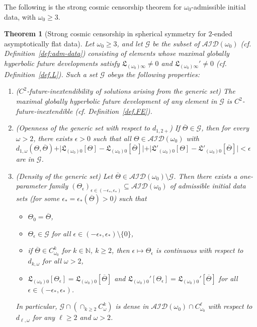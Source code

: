 \documentclass[10pt, reqno]{amsart}
\newtheorem{theorem}{Theorem}[section]
\theoremstyle{definition}
\theoremstyle{remark}
\numberwithin{equation}{section}
\newcommand{\abs}[1]{\vert#1\vert}
\newcommand{\ep}{\epsilon}
\newcommand{\0}{\emptyset}
\newcommand{\eps}{\epsilon}
\newcommand{\Tht}{\Theta}
\newcommand{\omg}{\omega}
\newcommand{\om}{\omega}
\newcommand{\calA}{\mathcal A}
\newcommand{\calD}{\mathcal D}
\newcommand{\calG}{\mathcal G}
\newcommand{\calI}{\mathcal I}
\begin{document}
The following is the strong cosmic censorship theorem for $\omg_{0}$-admissible initial data, with $\omg_0 \geq 3$.
\begin{theorem}[Strong cosmic censorship in spherical symmetry for $2$-ended asymptotically flat data] \label{cor:scc}
Let $\omg_{0} \geq 3$, and let $\calG$ be the subset of $\calA \calI \calD(\omg_{0})$ (cf. Definition~\ref{def:adm-data}) consisting of elements whose maximal globally hyperbolic future developments satisfy $\mathfrak{L}_{(\omg_{0}) \infty} \neq 0$ and $\mathfrak{L}_{(\omg_{0}) \infty}' \neq 0$ (cf. Definition~\ref{def.L}). Such a set $\calG$ obeys the following properties:
\begin{enumerate}
\item ($C^2$-future-inextendibility of solutions arising from the generic set) The maximal globally hyperbolic future development of any element in $\mathcal G$ is $C^2$-future-inextendible (cf. Definition~\ref{def.FE}).
\item (Openness of the generic set with respect to $d_{1, 2+}$) If $\overline{\Tht} \in \mathcal G$, then for every $\om>2$, there exists $\ep>0$ such that all $\Tht \in \calA \calI \calD(\omg_{0})$ with $d_{1, \omg}(\Tht, \overline{\Tht}) + \abs{\mathfrak{L}_{(\omg_{0}) 0}[\Tht] - \mathfrak{L}_{(\omg_{0}) 0}[\overline{\Tht}]} + \abs{\mathfrak{L}'_{(\omg_{0}) 0}[\Tht] - \mathfrak{L}'_{(\omg_{0}) 0}[\overline{\Tht}]} <\epsilon$ are in $\mathcal G$. 
\item (Density of the generic set) 
Let $\overline{\Tht} \in \calA \calI \calD (\omg_0) \setminus \calG$. Then there exists a one-parameter family $(\Tht_{\eps})_{\eps \in (-\eps_{\ast}, \eps_{\ast})} \subseteq \calA \calI \calD (\omg_0)$ of admissible initial data sets (for some $\eps_{\ast} = \eps_{\ast}(\overline{\Tht}) > 0$) such that 
\begin{itemize}
\item $\Tht_{0} = \overline{\Tht}$, 
\item $\Tht_{\eps} \in \calG$ for all $\eps \in (-\eps_{\ast}, \eps_{\ast})\setminus\{0\}$,
\item if $\overline{\Theta}\in C^k_{\omg_0}$ for $k\in\mathbb N$, $k\geq 2$, then $\eps \mapsto \Tht_{\eps}$ is continuous with respect to $d_{k, \omg}$ for all $\omg > 2$, 
\item $\mathfrak{L}_{(\omg_{0}) 0}[\Tht_{\eps}] = \mathfrak{L}_{(\omg_{0}) 0}[\overline{\Tht}]$ and $\mathfrak{L}_{(\omg_{0}) 0}'[\Tht_{\eps}] = \mathfrak{L}_{(\omg_{0}) 0}'[\overline{\Tht}]$ for all $\eps \in (-\eps_{\ast}, \eps_{\ast})$.
\end{itemize}
In particular, $\calG\cap \left(\cap_{k\geq 2} C^k_{\omg}\right)$ is dense in $\calA \calI \calD (\omg_0)\cap C^\ell_{\omg_0}$ with respect to $d_{\ell, \omg}$ for any $\ell\geq 2$ and $\omg > 2$.
\end{enumerate}
\end{theorem}
\end{document}
